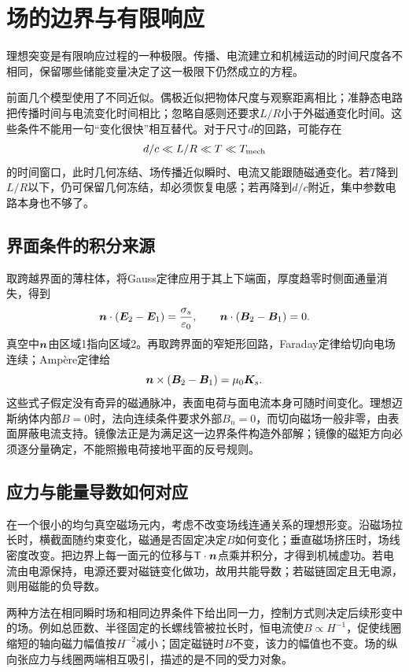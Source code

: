 \section{场的边界与有限响应}\label{sec:i4-boundary}
理想突变是有限响应过程的一种极限。传播、电流建立和机械运动的时间尺度各不相同，保留哪些储能变量决定了这一极限下仍然成立的方程。

前面几个模型使用了不同近似。偶极近似把物体尺度与观察距离相比；准静态电路把传播时间与电流变化时间相比；忽略自感则还要求$L/R$小于外磁通变化时间。这些条件不能用一句“变化很快”相互替代。对于尺寸$d$的回路，可能存在
\[
d/c\ll L/R\ll T\ll T_{\rm mech}
\]
的时间窗口，此时几何冻结、场传播近似瞬时、电流又能跟随磁通变化。若$T$降到$L/R$以下，仍可保留几何冻结，却必须恢复电感；若再降到$d/c$附近，集中参数电路本身也不够了。

\subsection{界面条件的积分来源}
取跨越界面的薄柱体，将Gauss定律应用于其上下端面，厚度趋零时侧面通量消失，得到
\[
\bm{n}\cdot(\bm{E}_2-\bm{E}_1)=\frac{\sigma_s}{\varepsilon_0},\qquad
\bm{n}\cdot(\bm{B}_2-\bm{B}_1)=0.
\]
真空中$\bm{n}$由区域1指向区域2。再取跨界面的窄矩形回路，Faraday定律给切向电场连续；Ampère定律给
\[
\bm{n}\times(\bm{B}_2-\bm{B}_1)=\mu_0\bm{K}_s.
\]
这些式子假定没有奇异的磁通脉冲，表面电荷与面电流本身可随时间变化。理想迈斯纳体内部$B=0$时，法向连续条件要求外部$B_n=0$，而切向磁场一般非零，由表面屏蔽电流支持。镜像法正是为满足这一边界条件构造外部解；镜像的磁矩方向必须逐分量确定，不能照搬电荷接地平面的反号规则。

\subsection{应力与能量导数如何对应}
在一个很小的均匀真空磁场元内，考虑不改变场线连通关系的理想形变。沿磁场拉长时，横截面随约束变化，磁通是否固定决定$B$如何变化；垂直磁场挤压时，场线密度改变。把边界上每一面元的位移与$\mathsf T\cdot\bm{n}$点乘并积分，才得到机械虚功。若电流由电源保持，电源还要对磁链变化做功，故用共能导数；若磁链固定且无电源，则用磁能的负导数。

两种方法在相同瞬时场和相同边界条件下给出同一力，控制方式则决定后续形变中的场。例如总匝数、半径固定的长螺线管被拉长时，恒电流使$B\propto H^{-1}$，促使线圈缩短的轴向磁力幅值按$H^{-2}$减小；固定磁链时$B$不变，该力的幅值也不变。场的纵向张应力与线圈两端相互吸引，描述的是不同的受力对象。

